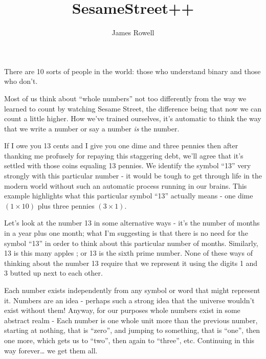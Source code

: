 \documentclass{article}
\title{SesameStreet++}
\author{James Rowell}
\begin{document}
\maketitle
\begin{em}
\small{}There are 10 sorts of people in the world: those who understand binary and those who don't.
\end{em}
\normalsize
\bigskip

Most of us think about ``whole numbers'' not too differently from the way
we learned to count by watching Sesame Street,
the difference being that now we can count a little higher.
How we've trained ourselves, it's automatic to think the way
that we write a number or say a number \emph{is} the number.

If I owe you 13 cents and I give you one dime and three pennies then 
after thanking me profusely for repaying this staggering debt,
we'll agree that it's settled with those coins equaling 13 pennies. 
We identify the symbol ``13'' very strongly with this particular number - it would 
be tough to get through life in the modern world without such an automatic process
running in our brains. 
This example highlights what this particular symbol ``13'' actually means -
one dime $(1 \times 10)$ plus three pennies $(3 \times 1)$.

Let's look at the number 13 in some alternative ways - it's the 
number of months in a year plus one month;
what I'm suggesting is that there is no need for the symbol ``13'' in order
to think about this particular number of months. Similarly, 13 is this many apples
\faApple{}\faApple{}\faApple{}\faApple{}\faApple{}\faApple{}\faApple{}\faApple{}\faApple{}\faApple{}\faApple{}\faApple{}\faApple{};
or 13 is the sixth prime number. None of these ways of thinking about the number
13 require that we represent it using the digits 1 and 3 butted up next to each other.

Each number exists independently from any symbol or word that might represent it.
Numbers are an idea - perhaps such a strong idea that the universe wouldn't exist without them!
Anyway, for our purposes whole numbers exist in some abstract realm -
Each number is one whole unit more than the previous number,
starting at nothing, that is ``zero'', and jumping to something, that is ``one'',
then one more, which gets us to ``two'',
then again to ``three'', etc. Continuing in this way forever\dots{} we get them all.
\end{document}
